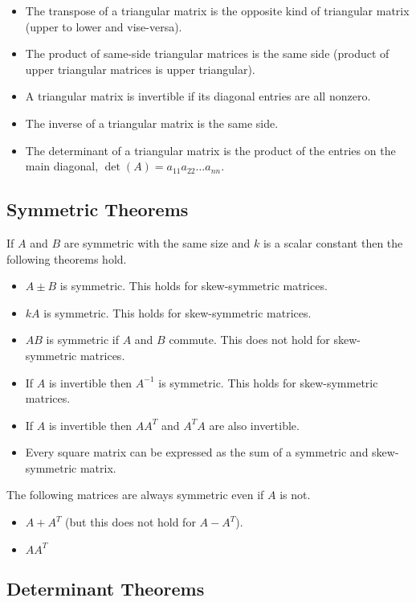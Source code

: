 \documentclass[12pt]{article}
\begin{document}
\begin{itemize}
    \item The transpose of a triangular matrix is the opposite kind of triangular matrix (upper to lower and vise-versa).
    \item The product of same-side triangular matrices is the same side (product of upper triangular matrices is upper triangular).
    \item A triangular matrix is invertible if its diagonal entries are all nonzero.
    \item The inverse of a triangular matrix is the same side.
    \item The determinant of a triangular matrix is the product of the entries on the main diagonal, $\det(A) = a_{11}a_{22}\dots a_{nn}$.
\end{itemize}


\subsection{Symmetric Theorems}

If $A$ and $B$ are symmetric with the same size and $k$ is a scalar constant then the following theorems hold.
\begin{itemize}
    \item $A \pm B$ is symmetric. This holds for skew-symmetric matrices.
    \item $kA$ is symmetric. This holds for skew-symmetric matrices.
    \item $AB$ is symmetric if $A$ and $B$ commute. This does not hold for skew-symmetric matrices.
    \item If $A$ is invertible then $A^{-1}$ is symmetric. This holds for skew-symmetric matrices.
    \item If $A$ is invertible then $AA^T$ and $A^TA$ are also invertible.
    \item Every square matrix can be expressed as the sum of a symmetric and skew-symmetric matrix.
\end{itemize}
The following matrices are always symmetric even if $A$ is not.
\begin{itemize}
    \item $A + A^T$ (but this does not hold for $A - A^T$).
    \item $AA^T$
\end{itemize}


\subsection{Determinant Theorems}
\end{document}
